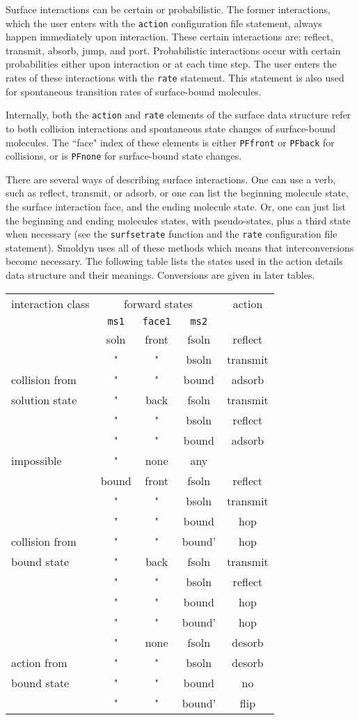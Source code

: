 \documentclass {book}
\begin{document}
Surface interactions can be certain or probabilistic. The former interactions, which the user enters with the \texttt{action} configuration file statement, always happen immediately upon interaction. These certain interactions are: reflect, transmit, absorb, jump, and port. Probabilistic interactions occur with certain probabilities either upon interaction or at each time step. The user enters the rates of these interactions with the \texttt{rate} statement. This statement is also used for spontaneous transition rates of surface-bound molecules.

Internally, both the \texttt{action} and \texttt{rate} elements of the surface data structure refer to both collision interactions and spontaneous state changes of surface-bound molecules. The ``face" index of these elements is either \texttt{PFfront} or \texttt{PFback} for collisions, or is \texttt{PFnone} for surface-bound state changes.

There are several ways of describing surface interactions. One can use a verb, such as reflect, transmit, or adsorb, or one can list the beginning molecule state, the surface interaction face, and the ending molecule state. Or, one can just list the beginning and ending molecules states, with pseudo-states, plus a third state when necessary (see the \texttt{surfsetrate} function and the \texttt{rate} configuration file statement). Smoldyn uses all of these methods which means that interconversions become necessary. The following table lists the states used in the action details data structure and their meanings. Conversions are given in later tables.

\begin{longtable}[c]{l|ccc|c}
interaction class&\multicolumn{3}{c}{forward states}&action\\
&\texttt{ms1}&\texttt{face1}&\texttt{ms2}\\
\hline
&soln&front&fsoln&reflect\\
&"&"&bsoln&transmit\\
collision from&"&"&bound&adsorb\\
solution state&"&back&fsoln&transmit\\
&"&"&bsoln&reflect\\
&"&"&bound&adsorb\\
\hline
impossible&"&none&any\\
\hline
&bound&front&fsoln&reflect\\
&"&"&bsoln&transmit\\
&"&"&bound&hop\\
collision from&"&"&bound'&hop\\
bound state&"&back&fsoln&transmit\\
&"&"&bsoln&reflect\\
&"&"&bound&hop\\
&"&"&bound'&hop\\
\hline
&"&none&fsoln&desorb\\
action from&"&"&bsoln&desorb\\
bound state&"&"&bound&no\\
&"&"&bound'&flip\\
\end{longtable}
\end{document}
